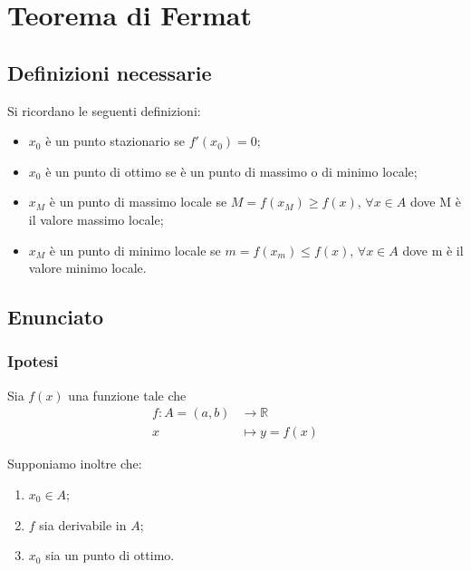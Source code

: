 \documentclass[../../analisi1]{subfiles}
\begin{document}
    \chapter{Teorema di Fermat}
    \label{teoFermat}

        \section*{Definizioni necessarie}

            Si ricordano le seguenti definizioni:

            \begin{itemize}
                \item \(x_0\) è un punto stazionario se \(f'(x_0) = 0\);
                \item \(x_0\) è un punto di ottimo se è un punto di massimo o di minimo locale;
                \item \(x_M\) è un punto di massimo locale se \(M = f(x_M) \geqslant f(x), \, \forall  x \in A\) dove M è il valore massimo locale;
                \item \(x_M\) è un punto di minimo locale se \(m = f(x_m) \leqslant f(x), \, \forall  x \in A\) dove m è il valore minimo locale.
            \end{itemize}

        \section*{Enunciato}

            \subsection*{Ipotesi}

                Sia \(f(x)\) una funzione tale che
                \begin{align*}
                    f : A = (a, b) &\longrightarrow \mathbb{R}\\
                    x &\longmapsto y = f(x) 
                \end{align*}

                Supponiamo inoltre che:

            \begin{enumerate}
                \indentitem \item \(x_0 \in A\);
                \indentitem \item \(f\) sia derivabile in \(A\);
                \indentitem \item \(x_0\) sia un punto di ottimo.
            \end{enumerate}
\end{document}

